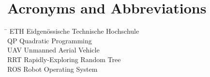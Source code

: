 \section*{Acronyms and Abbreviations}
\begin{tabbing}
 \hspace*{1.6cm}  \= \kill
 ETH \> Eidgen\"{o}ssische Technische Hochschule \\[0.5ex]
 QP \>  Quadratic Programming\\[0.5ex]
 UAV \> Unmanned Aerial Vehicle \\[0.5ex]
RRT \> Rapidly-Exploring Random Tree\\[0.5ex]
ROS \> Robot Operating System\\[0.5ex]
\end{tabbing}

 \cleardoublepage

